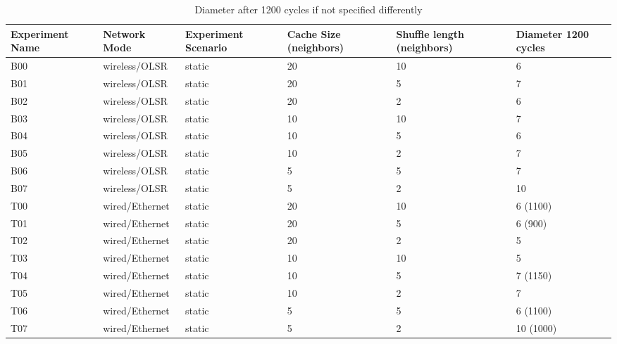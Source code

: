 \begin{table}
\begin{tabular} { |p{1.9cm}|l|p{1.9cm}|p{2cm}|p{2.4cm}|p{1.9cm}|}
\hline
Experiment Name & Network Mode & Experiment Scenario & Cache Size (neighbors) &
Shuffle length (neighbors) & Diameter 1200 cycles \\
\hline \hline
B00 & wireless/OLSR & static & 20 & 10 & 6\\
B01 & wireless/OLSR & static & 20 & 5 & 7\\
B02 & wireless/OLSR & static & 20 & 2 & 6\\
B03 & wireless/OLSR & static & 10 & 10 & 7\\
B04 & wireless/OLSR & static & 10 & 5 & 6\\
B05 & wireless/OLSR & static & 10 & 2 & 7\\
B06 & wireless/OLSR & static & 5 & 5 & 7\\
B07 & wireless/OLSR & static & 5 & 2 & 10\\
T00 & wired/Ethernet & static & 20 & 10 & 6 (1100)\\
T01 & wired/Ethernet & static & 20 & 5 & 6 (900)\\
T02 & wired/Ethernet & static & 20 & 2 & 5\\
T03 & wired/Ethernet & static & 10 & 10 & 5\\
T04 & wired/Ethernet & static & 10 & 5 & 7 (1150)\\
T05 & wired/Ethernet & static & 10 & 2 & 7\\
T06 & wired/Ethernet & static & 5 & 5 & 6 (1100)\\
T07 & wired/Ethernet & static & 5 & 2 & 10 (1000)\\
\hline
\end{tabular}
\caption{Diameter after 1200 cycles if not specified differently}
\label{tab:diameter}
\end{table}

